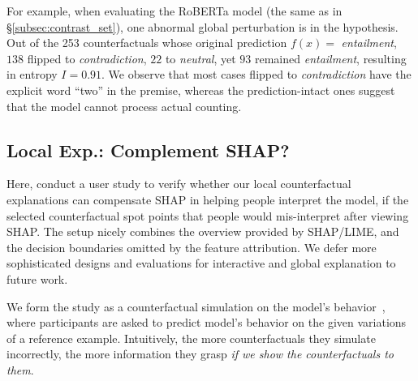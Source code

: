 For example, when evaluating the \nli RoBERTa model (the same as in \S\ref{subsec:contrast_set}), one abnormal global perturbation is  in the hypothesis.
Out of the 253 counterfactuals whose original prediction $f(x)=$ \emph{entailment}, $138$ flipped to \emph{contradiction}, $22$ to \emph{neutral}, yet $93$ remained \emph{entailment}, resulting in entropy $I=0.91$.
We observe that most cases flipped to \emph{contradiction} have the explicit word ``two'' in the premise, whereas the prediction-intact ones suggest that the model cannot process actual counting.



\subsection{Local Exp.: Complement SHAP?}
Here, conduct a user study to verify whether our local counterfactual explanations can compensate SHAP in helping people interpret the model, \ie if the selected counterfactual spot points that people would mis-interpret after viewing SHAP.
The setup nicely combines the overview provided by SHAP/LIME, and the decision boundaries omitted by the feature attribution. 
We defer more sophisticated designs and evaluations for interactive and global explanation to future work.

We form the study as a counterfactual simulation on the model's behavior~\cite{hase2020evaluating}, where participants are asked to predict model's behavior on the given variations of a reference example.
Intuitively, the more counterfactuals they simulate incorrectly, the more information they grasp \emph{if we show the counterfactuals to them}.

